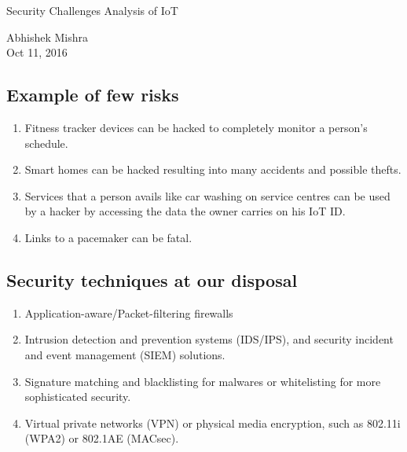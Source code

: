\documentclass{article}
\begin{document}
\begin{center}
\begin{Huge}
\textsf{Security Challenges Analysis of IoT}\\
\end{Huge}
Abhishek Mishra\\
Oct 11, 2016
\end{center}
\begin{multicols}{2}
\subsection*{Example of few risks}
\begin{enumerate}
\item Fitness tracker devices can be hacked to completely monitor a person's schedule.
\item Smart homes can be hacked resulting into many accidents and possible thefts.
\item Services that a person avails like car washing on service centres can be used by a hacker by accessing the data the owner carries on his IoT ID.
\item Links to a pacemaker can be fatal.
\end{enumerate}
\subsection*{Security techniques at our disposal}
\begin{enumerate}
\item Application-aware/Packet-filtering firewalls
\item Intrusion detection and prevention systems (IDS/IPS), and security incident and event management (SIEM) solutions.
\item Signature matching and blacklisting for malwares or whitelisting for more sophisticated security.
\item Virtual private networks (VPN) or physical media encryption, such as 802.11i
(WPA2) or 802.1AE (MACsec).
\end{enumerate}


\end{multicols}
\end{document}
